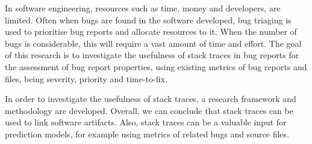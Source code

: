 
In software engineering, resources such as time, money and developers, are limited. Often when bugs are found in the software developed, bug triaging is used to prioritise bug reports and allocate resources to it. When the number of bugs is considerable, this will require a vast amount of time and effort. The goal of this research is to investigate the usefulness of stack traces in bug reports for the assessment of bug report properties, using existing metrics of bug reports and files, being severity, priority and time-to-fix.

In order to investigate the usefulness of stack traces, a research framework and methodology are developed. Overall, we can conclude that stack traces can be used to link software artifacts. Also, stack traces can be a valuable input for prediction models, for example using metrics of related bugs and source files. 




